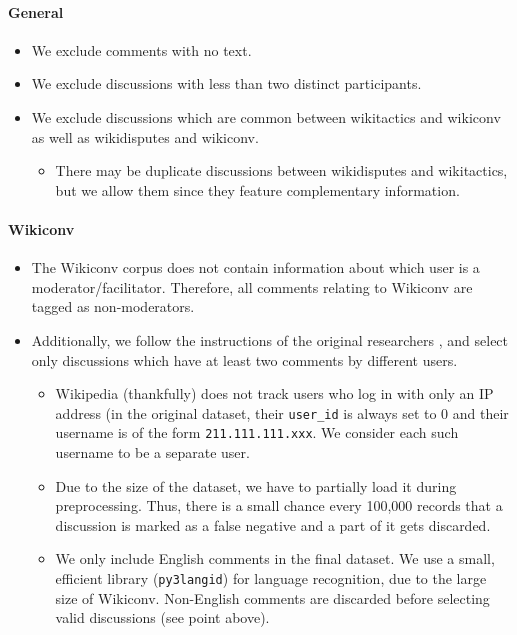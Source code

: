 \documentclass[11pt]{article}
\theoremstyle{definition}
\theoremstyle{plain}
\begin{document}
\paragraph{General}
\begin{itemize}
	\item We exclude comments with no text.
	\item We exclude discussions with less than two distinct participants.
	\item We exclude discussions which are common between wikitactics and wikiconv as well as wikidisputes and wikiconv.
	\begin{itemize}
		\item There may be duplicate discussions between wikidisputes and wikitactics, but we allow them since they feature complementary information.
	\end{itemize}
\end{itemize}

\paragraph{Wikiconv}
\begin{itemize}
	\item The Wikiconv corpus does not contain information about which user is a moderator/facilitator. Therefore, all comments relating to Wikiconv are tagged as non-moderators.
	\item Additionally, we follow the instructions of the original researchers \cite{wikiconv}, and select only discussions which have at least two comments by different users.
	\begin{itemize}
		\item Wikipedia (thankfully) does not track users who log in with only an IP address (in the original dataset, their \texttt{user\_id} is always set to 0 and their username is of the form \texttt{211.111.111.xxx}. We consider each such username to be a separate user.
		\item Due to the size of the dataset, we have to partially load it during preprocessing. Thus, there is a small chance every 100,000 records that a discussion is marked as a false negative and a part of it gets discarded.
		\item We only include English comments in the final dataset. We use a small, efficient library (\texttt{py3langid}) for language recognition, due to the large size of Wikiconv. Non-English comments are discarded before selecting valid discussions (see point above).
	\end{itemize}
\end{itemize}
\end{document}
